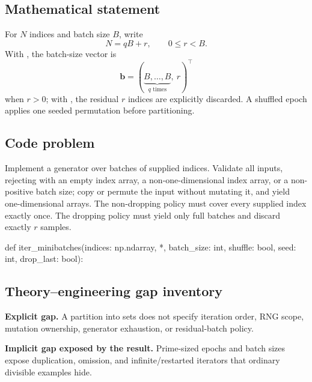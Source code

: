 
        \subsection{Mathematical statement}


For $N$ indices and batch size $B$, write
\[
  N=qB+r,\qquad 0\le r<B.
\]
With , the batch-size vector is
\[
  \bm b=(\underbrace{B,\ldots,B}_{q\text{ times}},\ r)^
  \top
\]
when $r>0$; with , the residual $r$ indices are explicitly
discarded.  A shuffled epoch applies one seeded permutation before partitioning.


        \subsection{Code problem}


Implement a generator over batches of supplied indices.  Validate all inputs,
rejecting with  an empty index array, a non-one-dimensional
index array, or a non-positive batch size;
copy or permute the input without mutating it, and yield one-dimensional arrays.
The non-dropping policy must cover every supplied index exactly once.  The
dropping policy must yield only full batches and discard exactly $r$ samples.


        \begin{contractbox}
        \begin{Code}
        def iter_minibatches(indices: np.ndarray, *, batch_size: int, shuffle: bool, seed: int, drop_last: bool):
        \end{Code}
        \end{contractbox}

        \subsection{Theory--engineering gap inventory}

        \begin{gapbox}
        \textbf{Explicit gap.} A partition into sets does not specify iteration order, RNG scope, mutation ownership, generator exhaustion, or residual-batch policy.

        \textbf{Implicit gap exposed by the result.} Prime-sized epochs and batch sizes expose duplication, omission, and infinite/restarted iterators that ordinary divisible examples hide.
        \end{gapbox}

